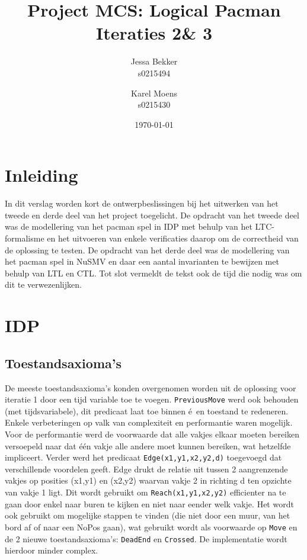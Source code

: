 \documentclass[a4paper,12pt]{article}
\title{Project MCS: Logical Pacman \\ Iteraties 2\& 3}
\author{Jessa Bekker\\s0215494 \and Karel Moens \\ s0215430 }
\date{\today}
\begin{document}
\maketitle


\section{Inleiding}
In dit verslag worden kort de ontwerpbeslissingen bij het uitwerken van het tweede en derde deel van het project toegelicht.
De opdracht van het tweede deel was de modellering van het pacman spel  in IDP met behulp van het LTC-formalisme en het uitvoeren van enkele verificaties daarop om de correctheid van de oplossing te testen.
De opdracht van het derde deel was de modellering van het pacman spel in NuSMV en daar een aantal invarianten te bewijzen met behulp van LTL en CTL.
Tot slot vermeldt de tekst ook de tijd die nodig was om dit te verwezenlijken.

\section{IDP}
\subsection{Toestandsaxioma's}
De meeste toestandsaxioma's konden overgenomen worden uit de oplossing voor iteratie 1 door een tijd variable toe te voegen. \texttt{PreviousMove} werd ook behouden (met tijdsvariabele), dit predicaat laat toe binnen \'e\ en toestand te redeneren. Enkele verbeteringen op valk van complexiteit en performantie waren mogelijk. Voor de performantie werd de voorwaarde dat alle vakjes elkaar moeten bereiken versoepeld naar dat \'e\'en vakje alle andere moet kunnen bereiken, wat hetzelfde impliceert. Verder werd het predicaat \texttt{Edge(x1,y1,x2,y2,d)} toegevoegd dat verschillende voordelen geeft. Edge drukt de relatie uit tussen 2 aangrenzende vakjes op posities (x1,y1) en (x2,y2) waarvan vakje 2 in richting d ten opzichte van vakje 1 ligt. Dit wordt gebruikt om \texttt{Reach(x1,y1,x2,y2)} efficienter na te gaan door enkel naar buren te kijken en niet naar eender welk vakje. Het wordt ook gebruikt om mogelijke stappen te vinden (die niet door een muur, van het bord af of naar een NoPos gaan), wat gebruikt wordt als voorwaarde op \texttt{Move} en de 2 nieuwe toestandsaxioma's: \texttt{DeadEnd} en \texttt{Crossed}. De implementatie wordt hierdoor minder complex.
\end{document}
